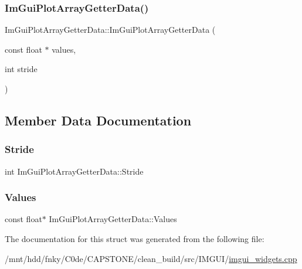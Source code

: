 \subsubsection{\texorpdfstring{Im\+Gui\+Plot\+Array\+Getter\+Data()}{ImGuiPlotArrayGetterData()}}
{\footnotesize\ttfamily Im\+Gui\+Plot\+Array\+Getter\+Data\+::\+Im\+Gui\+Plot\+Array\+Getter\+Data (\begin{DoxyParamCaption}\item[{const float $\ast$}]{values,  }\item[{int}]{stride }\end{DoxyParamCaption})\hspace{0.3cm}{\ttfamily [inline]}}



\subsection{Member Data Documentation}
\mbox{\label{structImGuiPlotArrayGetterData_aecb2cce4ea91d95ec81937de656cfcd6}} 
\subsubsection{\texorpdfstring{Stride}{Stride}}
{\footnotesize\ttfamily int Im\+Gui\+Plot\+Array\+Getter\+Data\+::\+Stride}

\mbox{\label{structImGuiPlotArrayGetterData_aa40ff2e945549744fc622891089ae0fd}} 
\subsubsection{\texorpdfstring{Values}{Values}}
{\footnotesize\ttfamily const float$\ast$ Im\+Gui\+Plot\+Array\+Getter\+Data\+::\+Values}



The documentation for this struct was generated from the following file\+:\begin{DoxyCompactItemize}
\item 
/mnt/hdd/fnky/\+C0de/\+C\+A\+P\+S\+T\+O\+N\+E/clean\+\_\+build/src/\+I\+M\+G\+U\+I/\hyperlink{imgui__widgets_8cpp}{imgui\+\_\+widgets.\+cpp}\end{DoxyCompactItemize}
